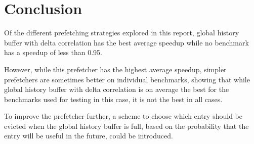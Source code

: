 \section{Conclusion}
\label{sec:conclusion}

Of the different prefetching strategies explored in this report,
global history buffer with delta correlation has the best average
speedup while no benchmark has a speedup of less than 0.95.

However, while this prefetcher has the highest average
speedup, simpler prefetchers are sometimes better on
individual benchmarks, showing that while global history buffer
with delta correlation is on average the best for the benchmarks
used for testing in this case, it is not the best in all cases.

To improve the prefetcher further, a scheme to choose which
entry should be evicted when the global history buffer is full,
based on the probability that the entry will be useful in the
future, could be introduced.

